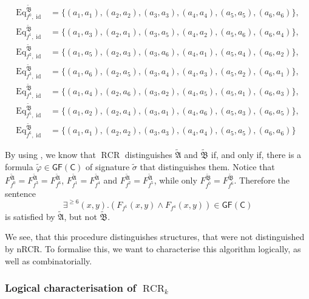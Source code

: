 \documentclass[a4paper,11pt,DIV=15]{scrartcl} %
\renewcommand{\phi}{\varphi}
\theoremstyle{plain}
\theoremstyle{definition}
\newcommand{\GFC}{\mathsf{GF}(\mathsf{C})}
\newcommand{\RCR}{\operatorname{RCR}}
\begin{document}
\begin{align*}
	\operatorname{Eq}_{f^0,\operatorname{id}}^{\widetilde{\mathfrak B}}&=\{(a_1, a_1), (a_2, a_2),(a_3, a_3), (a_4, a_4), (a_5, a_5), (a_6, a_6)\}, \\
	\operatorname{Eq}_{f^1,\operatorname{id}}^{\widetilde{\mathfrak B}}&=\{(a_1, a_3), (a_2, a_1),(a_3, a_5), (a_4, a_2), (a_5, a_6), (a_6, a_4)\}, \\
	\operatorname{Eq}_{f^2,\operatorname{id}}^{\widetilde{\mathfrak B}}&=\{(a_1, a_5), (a_2, a_3),(a_3, a_6), (a_4, a_1), (a_5, a_4), (a_6, a_2)\}, \\
	\operatorname{Eq}_{f^3,\operatorname{id}}^{\widetilde{\mathfrak B}}&=\{(a_1, a_6), (a_2, a_5),(a_3, a_4), (a_4, a_3), (a_5, a_2), (a_6, a_1)\}, \\
	\operatorname{Eq}_{f^4,\operatorname{id}}^{\widetilde{\mathfrak B}}&=\{(a_1, a_4), (a_2, a_6),(a_3, a_2), (a_4, a_5), (a_5, a_1), (a_6, a_3)\}, \\
	\operatorname{Eq}_{f^5,\operatorname{id}}^{\widetilde{\mathfrak B}}&=\{(a_1, a_2), (a_2, a_4),(a_3, a_1), (a_4, a_6), (a_5, a_3), (a_6, a_5)\}, \\
	\operatorname{Eq}_{f^6,\operatorname{id}}^{\widetilde{\mathfrak B}}&=\{(a_1, a_1), (a_2, a_2),(a_3, a_3), (a_4, a_4), (a_5, a_5), (a_6, a_6)\}
\end{align*}

By using \cite{scheidt2025ColorRefinement}, we know that $\RCR$ distinguishes $\widetilde{\mathfrak A}$ and $\widetilde{\mathfrak B}$ if, and only if, there is a formula $\widetilde{\phi}\in\GFC$ of signature $\widetilde{\sigma}$ that distinguishes them.
Notice that $F_{f^0}^{\widetilde{\mathfrak A}}=F_{f^3}^{\widetilde{\mathfrak A}}=F_{f^6}^{\widetilde{\mathfrak A}}$, $F_{f^1}^{\widetilde{\mathfrak A}}=F_{f^4}^{\widetilde{\mathfrak A}}$ and $F_{f^2}^{\widetilde{\mathfrak A}}=F_{f^5}^{\widetilde{\mathfrak A}}$, while only $F_{f^0}^{\widetilde{\mathfrak B}}=F_{f^6}^{\widetilde{\mathfrak B}}$.
Therefore the sentence 
$$\exists^{\geq 6}(x,y).\left(F_{f^1}(x,y) \land F_{f^4}(x,y)\right)\in \GFC$$ 
is satisfied by $\widetilde{\mathfrak A}$, but not $\widetilde{\mathfrak B}$.

We see, that this procedure distinguishes structures, that were not distinguished by nRCR.
To formalise this, we want to characterise this algorithm logically, as well as combinatorially.

\subsubsection{Logical characterisation of $\RCR_k$}
\end{document}
